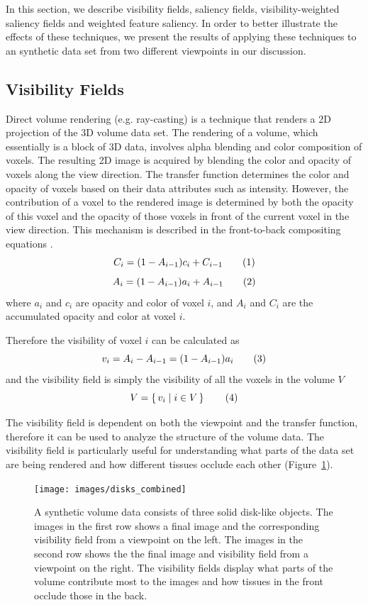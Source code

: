 In this section, we describe visibility fields, saliency fields, visibility-weighted saliency fields and weighted feature saliency. In order to better illustrate the effects of these techniques, we present the results of applying these techniques to an synthetic data set from two different viewpoints in our discussion.

\subsection{Visibility Fields}
Direct volume rendering (e.g. ray-casting) is a technique that renders a 2D projection of the 3D volume data set. The rendering of a volume, which essentially is a block of 3D data, involves alpha blending and color composition of voxels. The resulting 2D image is acquired by blending the color and opacity of voxels along the view direction. The transfer function determines the color and opacity of voxels based on their data attributes such as intensity. However, the contribution of a voxel to the rendered image is determined by both the opacity of this voxel and the opacity of those voxels in front of the current voxel in the view direction.
This mechanism is described in the front-to-back compositing equations \cite{emsenhuber_visibility_2008}.
\[
C_{i}=(1-A_{i-1})c_{i}+C_{i-1}
\addtag \]
\[
A_{i}=(1-A_{i-1})a_{i}+A_{i-1}
\addtag \]
where $ a_{i} $ and $ c_{i} $ are opacity and color of voxel $ i $, and $A_{i}$ and $C_{i}$ are the accumulated opacity and color at  voxel $ i $.

Therefore the visibility of voxel $ i $ can be calculated as
\[ v_{i}=A_{i}-A_{i-1}=(1-A_{i-1})a_{i} 
\addtag \]
and the visibility field is simply the visibility of all the voxels in the volume $ V $
\[ V=\set{v_{i}|i \in V} 
\addtag \]

The visibility field is dependent on both the viewpoint and the transfer function, therefore it can be used to analyze the structure of the volume data. The visibility field is particularly useful for understanding what parts of the data set are being rendered and how different tissues occlude each other (Figure~\ref{fig:disks_combined}).

\begin{figure}
	\centering
	\texttt{[image: images/disks\_combined]}
	\caption{A synthetic volume data consists of three solid disk-like objects. The images in the first row shows a final image and the corresponding visibility field from a viewpoint on the left.
		The images in the second row shows the the final image and visibility field from a viewpoint on the right.
		The visibility fields display what parts of the volume contribute most to the images and how tissues in the front occlude those in the back.}
	\label{fig:disks_combined}
\end{figure}

